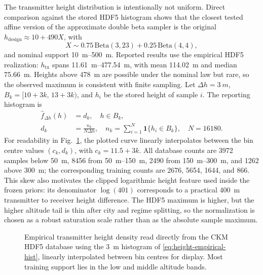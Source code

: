 \documentclass[journal]{IEEEtran}
\begin{document}
The transmitter height distribution is intentionally not uniform. Direct
comparison against the stored HDF5 histogram shows that the closest tested
affine version of the approximate double beta sampler is the original
\(h_{\mathrm{design}}\approx 10+490X\), with
\[
X\sim 0.75\,\mathrm{Beta}(3,23)+0.25\,\mathrm{Beta}(4,4),
\]
and nominal support \SIrange{10}{500}{m}. Reported results use the empirical
HDF5 realization: \(h_{\mathrm{tx}}\) spans \SIrange{11.61}{477.54}{m}, with
mean \SI{114.02}{m} and median \SI{75.66}{m}. Heights above \SI{478}{m} are
possible under the nominal law but rare, so the observed maximum is consistent
with finite sampling. Let \(\Delta h=\SI{3}{m}\),
\(B_k=[10+3k,\,13+3k)\), and \(h_i\) be the stored height of sample \(i\).
The reporting histogram is
\begin{equation}
  \begin{aligned}
  \hat f_{\Delta h}(h) &= d_k,\quad h\in B_k,\\
  d_k &= \frac{n_k}{N\Delta h},\quad
  n_k = \sum_{i=1}^{N}\mathbf{1}\{h_i\in B_k\},\quad N=16180 .
  \end{aligned}
  \label{eq:height-empirical-hist}
\end{equation}
For readability in Fig.~\ref{fig:height-density}, the plotted curve linearly
interpolates between the bin centre values \((c_k,d_k)\), with
\(c_k=11.5+3k\).
All database counts are 3972 samples below \SI{50}{m}, 8456 from
\SIrange{50}{150}{m}, 2490 from \SIrange{150}{300}{m}, and 1262 above
\SI{300}{m}; the corresponding training counts are 2676, 5654, 1644, and 866.
This skew also motivates the clipped logarithmic height feature used inside the
frozen priors: its denominator \(\log(401)\) corresponds to a practical
\SI{400}{m} transmitter to receiver height difference. The HDF5 maximum is
higher, but the higher altitude tail is thin after city and regime splitting,
so the normalization is chosen as a robust saturation scale rather than as the
absolute sample maximum.

\begin{figure}[!t]
\centering
{}
\caption{Empirical transmitter height density read directly from the CKM
HDF5 database using the \SI{3}{m} histogram of
\eqref{eq:height-empirical-hist}, linearly interpolated between bin centres
for display. Most training support lies in the low and middle altitude bands.}
\label{fig:height-density}
\end{figure}
\end{document}
